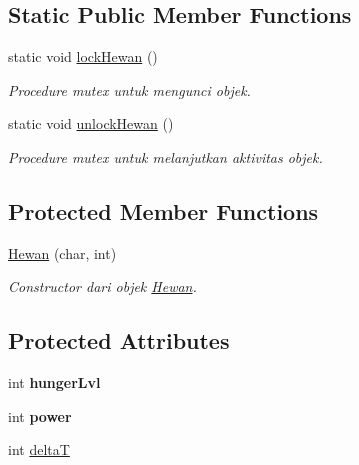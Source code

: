 \subsection*{Static Public Member Functions}
\begin{DoxyCompactItemize}
\item 
static void \hyperlink{class_hewan_a53f67234a3880648f1975eab96ed80e7}{lock\+Hewan} ()
\begin{DoxyCompactList}\small\item\em Procedure mutex untuk mengunci objek. \end{DoxyCompactList}\item 
static void \hyperlink{class_hewan_a1cee77699cbcafb93ddb6902a0a0fed2}{unlock\+Hewan} ()
\begin{DoxyCompactList}\small\item\em Procedure mutex untuk melanjutkan aktivitas objek. \end{DoxyCompactList}\end{DoxyCompactItemize}
\subsection*{Protected Member Functions}
\begin{DoxyCompactItemize}
\item 
\hyperlink{class_hewan_a5ea6a7a559331a71c86c59eaeb3809db}{Hewan} (char, int)
\begin{DoxyCompactList}\small\item\em Constructor dari objek \hyperlink{class_hewan}{Hewan}. \end{DoxyCompactList}\end{DoxyCompactItemize}
\subsection*{Protected Attributes}
\begin{DoxyCompactItemize}
\item 
int {\bfseries hunger\+Lvl}\hypertarget{class_hewan_ac2181643305f48f23c648b58d5b662b5}{}\label{class_hewan_ac2181643305f48f23c648b58d5b662b5}

\item 
int {\bfseries power}\hypertarget{class_hewan_a3fbf8081066fe2fb2b7b8cce149910a1}{}\label{class_hewan_a3fbf8081066fe2fb2b7b8cce149910a1}

\item 
int \hyperlink{class_hewan_a7d22294907eb5b03983fdb179b248c18}{deltaT}
\end{DoxyCompactItemize}
